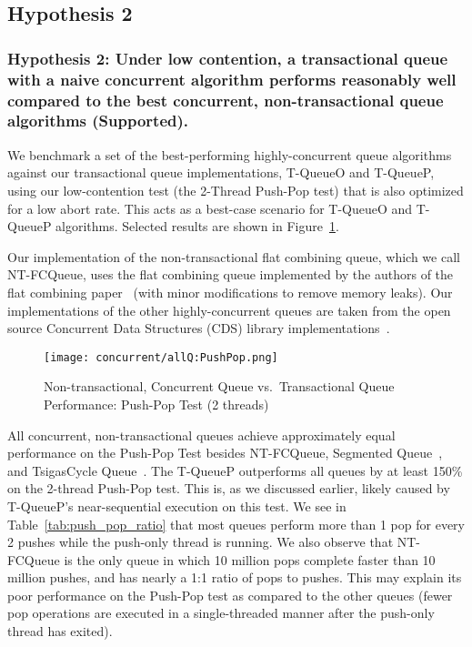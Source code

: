 \subsection{Hypothesis 2}
\subsubsection{Hypothesis 2: Under low contention, a transactional queue with a naive concurrent algorithm performs reasonably well compared to the best concurrent, non-transactional queue algorithms (Supported).}

We benchmark a set of the best-performing highly-concurrent queue algorithms against our transactional queue implementations, T-QueueO and T-QueueP, using our low-contention test (the 2-Thread Push-Pop test) that is also optimized for a low abort rate. This acts as a best-case scenario for T-QueueO and T-QueueP algorithms. Selected results are shown in Figure~\ref{fig:ntqs_pp}.

Our implementation of the non-transactional flat combining queue, which we call NT-FCQueue, uses the flat combining queue implemented by the authors of the flat combining paper~\cite{flatcombining} (with minor modifications to remove memory leaks). Our implementations of the other highly-concurrent queues are taken from the open source Concurrent Data Structures (CDS) library implementations~\cite{libcds}. 

\begin{figure}[t!]
    \centering
	\begin{minipage}{\textwidth}
        {\texttt{[image: concurrent/allQ:PushPop.png]}}
	\end{minipage}
    \caption{Non-transactional, Concurrent Queue vs.\ Transactional Queue Performance: Push-Pop Test (2 threads)}
    \label{fig:ntqs_pp}
\end{figure}

All concurrent, non-transactional queues achieve approximately equal performance on the Push-Pop Test besides NT-FCQueue, Segmented Queue~\cite{queue4}, and TsigasCycle Queue~\cite{queue5}. 
The T-QueueP outperforms all queues by at least 150\% on the 2-thread Push-Pop test. This is, as we discussed earlier, likely caused by T-QueueP's near-sequential execution on this test. We see in Table~\ref{tab:push_pop_ratio} that most queues perform more than 1 pop for every 2 pushes while the push-only thread is running. We also observe that NT-FCQueue is the only queue in which 10 million pops complete faster than 10 million pushes, and has nearly a 1:1 ratio of pops to pushes. This may explain its poor performance on the Push-Pop test as compared to the other queues (fewer pop operations are executed in a single-threaded manner after the push-only thread has exited).

